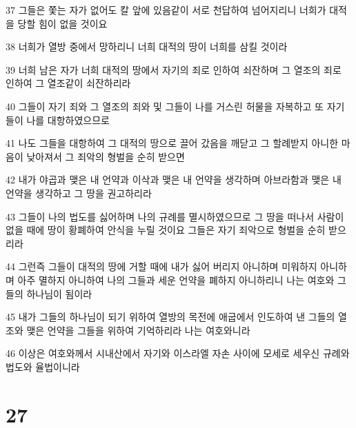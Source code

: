 \par 37 그들은 쫓는 자가 없어도 칼 앞에 있음같이 서로 천답하여 넘어지리니 너희가 대적을 당할 힘이 없을 것이요
\par 38 너희가 열방 중에서 망하리니 너희 대적의 땅이 너희를 삼킬 것이라
\par 39 너희 남은 자가 너희 대적의 땅에서 자기의 죄로 인하여 쇠잔하며 그 열조의 죄로 인하여 그 열조같이 쇠잔하리라
\par 40 그들이 자기 죄와 그 열조의 죄와 및 그들이 나를 거스린 허물을 자복하고 또 자기들이 나를 대항하였으므로
\par 41 나도 그들을 대항하여 그 대적의 땅으로 끌어 갔음을 깨닫고 그 할례받지 아니한 마음이 낮아져서 그 죄악의 형벌을 순히 받으면
\par 42 내가 야곱과 맺은 내 언약과 이삭과 맺은 내 언약을 생각하며 아브라함과 맺은 내 언약을 생각하고 그 땅을 권고하리라
\par 43 그들이 나의 법도를 싫어하며 나의 규례를 멸시하였으므로 그 땅을 떠나서 사람이 없을 때에 땅이 황폐하여 안식을 누릴 것이요 그들은 자기 죄악으로 형벌을 순히 받으리라
\par 44 그런즉 그들이 대적의 땅에 거할 때에 내가 싫어 버리지 아니하며 미워하지 아니하며 아주 멸하지 아니하여 나의 그들과 세운 언약을 폐하지 아니하리니 나는 여호와 그들의 하나님이 됨이라
\par 45 내가 그들의 하나님이 되기 위하여 열방의 목전에 애굽에서 인도하여 낸 그들의 열조와 맺은 언약을 그들을 위하여 기억하리라 나는 여호와니라
\par 46 이상은 여호와께서 시내산에서 자기와 이스라엘 자손 사이에 모세로 세우신 규례와 법도와 율법이니라

\chapter{27}

